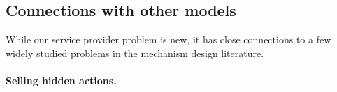 \subsection{Connections with other models} \label{connections}





While our service provider problem is new, it has close connections to a few widely studied problems in the mechanism design literature. 

\paragraph{Selling hidden actions.}

